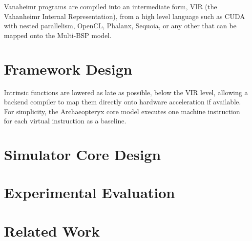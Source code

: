 \documentclass[conference, 10pt]{IEEEtran}
\begin{document}
Vanaheimr programs are compiled into an intermediate form, VIR (the Vahanheimr
Internal Representation), from a high level language such as CUDA with nested
parallelism, OpenCL, Phalanx, Sequoia, or any other that can be mapped onto
the Multi-BSP model.  




\section{Framework Design}

Intrinsic functions are lowered as late as possible, below the
VIR level, allowing a backend compiler to map them directly onto hardware
acceleration if available.  For simplicity, the Archaeopteryx core model
executes one machine instruction for each virtual instruction as a baseline.

%
%



\section{Simulator Core Design}

\section{Experimental Evaluation}

\section{Related Work}


\end{document}
